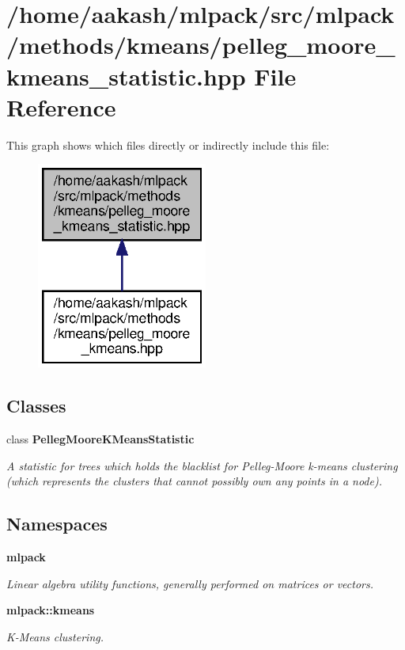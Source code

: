 \section{/home/aakash/mlpack/src/mlpack/methods/kmeans/pelleg\+\_\+moore\+\_\+kmeans\+\_\+statistic.hpp File Reference}
\label{pelleg__moore__kmeans__statistic_8hpp}
This graph shows which files directly or indirectly include this file\+:
\nopagebreak
\begin{figure}[H]
\begin{center}
\leavevmode
\includegraphics[width=159pt]{pelleg__moore__kmeans__statistic_8hpp__dep__incl}
\end{center}
\end{figure}
\subsection*{Classes}
\begin{DoxyCompactItemize}
\item 
class \textbf{ Pelleg\+Moore\+K\+Means\+Statistic}
\begin{DoxyCompactList}\small\item\em A statistic for trees which holds the blacklist for Pelleg-\/\+Moore k-\/means clustering (which represents the clusters that cannot possibly own any points in a node). \end{DoxyCompactList}\end{DoxyCompactItemize}
\subsection*{Namespaces}
\begin{DoxyCompactItemize}
\item 
 \textbf{ mlpack}
\begin{DoxyCompactList}\small\item\em Linear algebra utility functions, generally performed on matrices or vectors. \end{DoxyCompactList}\item 
 \textbf{ mlpack\+::kmeans}
\begin{DoxyCompactList}\small\item\em K-\/\+Means clustering. \end{DoxyCompactList}\end{DoxyCompactItemize}


